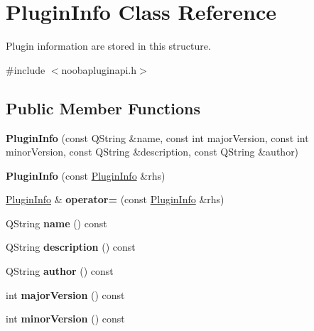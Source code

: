 \hypertarget{class_plugin_info}{\section{Plugin\-Info Class Reference}
\label{class_plugin_info}
}


Plugin information are stored in this structure.  




{\ttfamily \#include $<$noobapluginapi.\-h$>$}

\subsection*{Public Member Functions}
\begin{DoxyCompactItemize}
\item 
\hypertarget{class_plugin_info_a28a7ce1796230a533b9bdb99653c9df5}{{\bfseries Plugin\-Info} (const Q\-String \&name, const int major\-Version, const int minor\-Version, const Q\-String \&description, const Q\-String \&author)}\label{class_plugin_info_a28a7ce1796230a533b9bdb99653c9df5}

\item 
\hypertarget{class_plugin_info_aab6b4739162eb44207b4854e19d3dd9d}{{\bfseries Plugin\-Info} (const \hyperlink{class_plugin_info}{Plugin\-Info} \&rhs)}\label{class_plugin_info_aab6b4739162eb44207b4854e19d3dd9d}

\item 
\hypertarget{class_plugin_info_aac1aba18706e202ebda5ea27de0e72f4}{\hyperlink{class_plugin_info}{Plugin\-Info} \& {\bfseries operator=} (const \hyperlink{class_plugin_info}{Plugin\-Info} \&rhs)}\label{class_plugin_info_aac1aba18706e202ebda5ea27de0e72f4}

\item 
\hypertarget{class_plugin_info_a1b864de6e5bfe9962c5cba713d35a84e}{Q\-String {\bfseries name} () const }\label{class_plugin_info_a1b864de6e5bfe9962c5cba713d35a84e}

\item 
\hypertarget{class_plugin_info_a0667c19893ce1bc822a096d18023e4ce}{Q\-String {\bfseries description} () const }\label{class_plugin_info_a0667c19893ce1bc822a096d18023e4ce}

\item 
\hypertarget{class_plugin_info_a9e8d357df9b02ef186799be731397cdb}{Q\-String {\bfseries author} () const }\label{class_plugin_info_a9e8d357df9b02ef186799be731397cdb}

\item 
\hypertarget{class_plugin_info_ab44ab9c20a907d7cc6aab3154e34d64a}{int {\bfseries major\-Version} () const }\label{class_plugin_info_ab44ab9c20a907d7cc6aab3154e34d64a}

\item 
\hypertarget{class_plugin_info_a0f81901bccba9544c180bd9eb813c0dc}{int {\bfseries minor\-Version} () const }\label{class_plugin_info_a0f81901bccba9544c180bd9eb813c0dc}

\end{DoxyCompactItemize}


